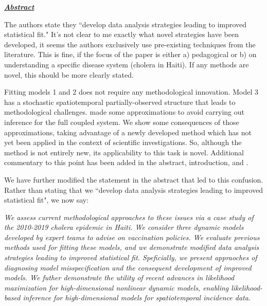 \documentclass[11pt]{article}
\newcommand\report[1]{{\color{mygreen} \vspace{1mm}\hspace{0.25in}\parbox{6in}{\em #1}}}
\newcommand\article[1]{{\color{blue} \vspace{1mm}\hspace{0.25in}\parbox{6in}{\em #1}}}
\begin{document}
\report{
  \textbf{\underline{Abstract}}

  The authors state they ``develop data analysis strategies leading to improved statistical fit." It's not clear to me exactly what novel strategies have been developed, it seems the authors exclusively use pre-existing techniques from the literature. This is fine, if the focus of the paper is either a) pedagogical or b) on understanding a specific disease system (cholera in Haiti). If any methods are novel, this should be more clearly stated.
}

Fitting models 1 and 2 does not require any methodological innovation. Model 3 has a stochastic spatiotemporal partially-observed structure that leads to methodological challenges. \cite{lee20} made some approximations to avoid carrying out inference for the full coupled system. We show some consequences of those approximations, taking advantage of a newly developed method which has not yet been applied in the context of scientific investigations. So, although the method is not entirely new, its applicability to this task is novel. 
Additional commentary to this point has been added in the abstract, introduction, and . 

We have further modified the statement in the abstract that led to this confusion. Rather than stating that we ``develop data analysis strategies leading to improved statistical fit", we now say: 

\article{We assess current methodological approaches to these issues via a case study of the 2010-2019 cholera epidemic in Haiti. We consider three dynamic models developed by expert teams to advise on vaccination policies. We evaluate previous methods used for fitting these models, and we demonstrate modified data analysis strategies leading to improved statistical fit. Speficially, we present appraoches of diagnosing model misspecification and the consequent development of improved models. We futher demonstrate the utility of recent advances in likelihood maximization for high-dimensional nonlinear dynamic models, enabling likelihood-based inference for high-dimensional models for spatiotemporal incidence data.}

\end{document}
